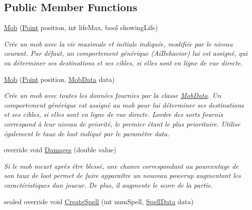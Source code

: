 \subsection*{Public Member Functions}
\begin{DoxyCompactItemize}
\item 
\hyperlink{class_tentacle_slicers_1_1actors_1_1_mob_a1f7b8eff3540a78e86ae8bcf3a00a811}{Mob} (\hyperlink{class_tentacle_slicers_1_1general_1_1_point}{Point} position, int life\+Max, bool showing\+Life)
\begin{DoxyCompactList}\small\item\em Crée un mob avec la vie maximale et initiale indiquée, modifiée par le niveau courant. Par défaut, un comportement générique (Ai\+Behavior) lui est assigné, qui va déterminer ses destinations et ses cibles, si elles sont en ligne de vue directe. \end{DoxyCompactList}\item 
\hyperlink{class_tentacle_slicers_1_1actors_1_1_mob_a6b74133be2effd4552c57f5f1a8fc596}{Mob} (\hyperlink{class_tentacle_slicers_1_1general_1_1_point}{Point} position, \hyperlink{class_tentacle_slicers_1_1actors_1_1_mob_data}{Mob\+Data} data)
\begin{DoxyCompactList}\small\item\em Crée un mob avec toutes les données fournies par la classe \hyperlink{class_tentacle_slicers_1_1actors_1_1_mob_data}{Mob\+Data}. Un comportement générique est assigné au mob pour lui déterminer ses destinations et ses cibles, si elles sont en ligne de vue directe. L\textquotesingle{}ordre des sorts fournis correspond à leur niveau de priorité, le premier étant le plus prioritaire. Utilise également le taux de loot indiqué par le paramètre data. \end{DoxyCompactList}\item 
override void \hyperlink{class_tentacle_slicers_1_1actors_1_1_mob_ac596097268c10f823e40533c869ced33}{Damages} (double value)
\begin{DoxyCompactList}\small\item\em Si le mob meurt après être blessé, une chance correspondant au pourcentage de son taux de loot permet de faire apparaître un nouveau powerup augmentant les caractéristiques d\textquotesingle{}un joueur. De plus, il augmente le score de la partie. \end{DoxyCompactList}\item 
sealed override void \hyperlink{class_tentacle_slicers_1_1actors_1_1_mob_a79c96a3a4ea1b3a874e28a467683dd39}{Create\+Spell} (int num\+Spell, \hyperlink{class_tentacle_slicers_1_1spells_1_1_spell_data}{Spell\+Data} data)

\end{DoxyCompactItemize}

